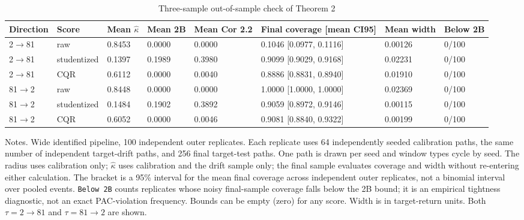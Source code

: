 \begin{table}[!ht]
\centering
\scriptsize
\caption{Three-sample out-of-sample check of Theorem 2}
\label{tab:14}
\begin{adjustbox}{max width=\linewidth}
\begin{tabular}{@{}llllllll@{}}
\toprule
Direction & Score & Mean $\hat\kappa$ & Mean 2B & Mean Cor 2.2 & Final coverage [mean CI95] & Mean width & Below 2B \\
\midrule
2$\to$81 & raw & 0.8453 & 0.0000 & 0.0000 & 0.1046 [0.0977, 0.1116] & 0.00126 & 0/100 \\
2$\to$81 & studentized & 0.1397 & 0.1989 & 0.3980 & 0.9099 [0.9029, 0.9168] & 0.02231 & 0/100 \\
2$\to$81 & CQR & 0.6112 & 0.0000 & 0.0040 & 0.8886 [0.8831, 0.8940] & 0.01910 & 0/100 \\
81$\to$2 & raw & 0.8448 & 0.0000 & 0.0000 & 1.0000 [1.0000, 1.0000] & 0.02369 & 0/100 \\
81$\to$2 & studentized & 0.1484 & 0.1902 & 0.3892 & 0.9059 [0.8972, 0.9146] & 0.00115 & 0/100 \\
81$\to$2 & CQR & 0.6052 & 0.0000 & 0.0046 & 0.9081 [0.8840, 0.9322] & 0.00199 & 0/100 \\
\bottomrule
\end{tabular}
\end{adjustbox}
\vspace{0.5em}
\par\noindent\begin{minipage}{\linewidth}\raggedright{\scriptsize Notes. Wide identified pipeline, 100 independent outer replicates. Each replicate uses 64 independently seeded calibration paths, the same number of independent target-drift paths, and 256 final target-test paths. One path is drawn per seed and window types cycle by seed. The radius uses calibration only; $\hat\kappa$ uses calibration and the drift sample only; the final sample evaluates coverage and width without re-entering either calculation. The bracket is a 95\% interval for the mean final coverage across independent outer replicates, not a binomial interval over pooled events. \texttt{Below 2B} counts replicates whose noisy final-sample coverage falls below the 2B bound; it is an empirical tightness diagnostic, not an exact PAC-violation frequency. Bounds can be empty (zero) for any score. Width is in target-return units. Both $\tau=2\to81$ and $\tau=81\to2$ are shown.}\end{minipage}\par

\end{table}
